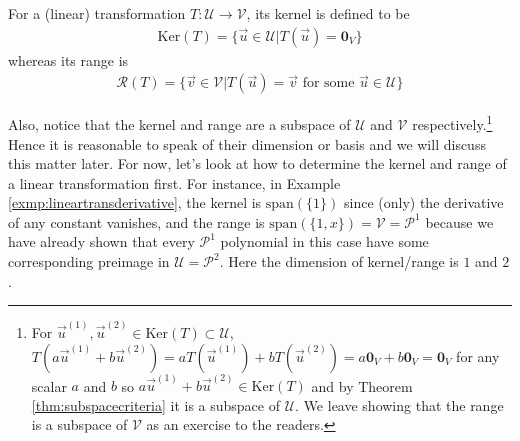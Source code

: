 \begin{defn}
\label{defn:kernelrange}
For a (linear) transformation $T: \mathcal{U} \to \mathcal{V}$, its kernel is defined to be
\begin{align}
\text{Ker}(T) = \{\vec{u} \in \mathcal{U} | T(\vec{u}) = \textbf{0}_V\}
\end{align}
whereas its range is
\begin{align}
\mathcal{R}(T) = \{\vec{v} \in \mathcal{V} | T(\vec{u}) = \vec{v} \text{ for some } \vec{u} \in \mathcal{U}\}    
\end{align}
\end{defn}
Also, notice that the kernel and range are a subspace of $\mathcal{U}$ and $\mathcal{V}$ respectively.\footnote{For $\vec{u}^{(1)}, \vec{u}^{(2)} \in \text{Ker}(T) \subset \mathcal{U}$, $T(a\vec{u}^{(1)} + b\vec{u}^{(2)}) = aT(\vec{u}^{(1)}) + bT(\vec{u}^{(2)}) = a\textbf{0}_V + b\textbf{0}_V = \textbf{0}_V$ for any scalar $a$ and $b$ so $a\vec{u}^{(1)} + b\vec{u}^{(2)} \in \text{Ker}(T)$ and by Theorem \ref{thm:subspacecriteria} it is a subspace of $\mathcal{U}$. We leave showing that the range is a subspace of $\mathcal{V}$ as an exercise to the readers.} Hence it is reasonable to speak of their dimension or basis and we will discuss this matter later. For now, let's look at how to determine the kernel and range of a linear transformation first. For instance, in Example \ref{exmp:lineartransderivative}, the kernel is $\text{span}(\{1\})$ since (only) the derivative of any constant vanishes, and the range is $\text{span}(\{1, x\}) = \mathcal{V} = \mathcal{P}^1$ because we have already shown that every $\mathcal{P}^1$ polynomial in this case have some corresponding preimage in $\mathcal{U} = \mathcal{P}^2$. Here the dimension of kernel/range is $1$ and $2$.

